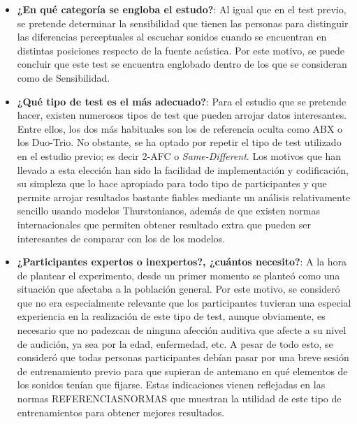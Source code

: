 \documentclass[11pt,a4paper,twoside]{book}
\begin{document}
            \begin{itemize}
                
                \item \textbf{¿En qué categoría se engloba el estudo?}: Al igual que en el test previo, se pretende determinar la sensibilidad que tienen las personas para distinguir las diferencias perceptuales al escuchar sonidos cuando se encuentran en distintas posiciones respecto de la fuente acústica. Por este motivo, se puede concluir que este test se encuentra englobado dentro de los que se consideran como de Sensibilidad.
                \item \textbf{¿Qué tipo de test es el más adecuado?}: Para el estudio que se pretende hacer, existen numerosos tipos de test que pueden arrojar datos interesantes. Entre ellos, los dos más habituales son los de referencia oculta como ABX o los Duo-Trio. No obstante, se ha optado por repetir el tipo de test utilizado en el estudio previo; es decir 2-AFC o \textit{Same-Different}. Los motivos que han llevado a esta elección han sido la facilidad de implementación y codificación, su simpleza que lo hace apropiado para todo tipo de participantes y que permite arrojar resultados bastante fiables mediante un análisis relativamente sencillo usando modelos Thurstonianos, además de que existen normas internacionales que permiten obtener resultado extra que pueden ser interesantes de comparar con los de los modelos.
                \item \textbf{¿Participantes expertos o inexpertos?, ¿cuántos necesito?}: A la hora de plantear el experimento, desde un primer momento se planteó como una situación que afectaba a la población general. Por este motivo, se consideró que no era especialmente relevante que los participantes tuvieran una especial experiencia en la realización de este tipo de test, aunque obviamente, es necesario que no padezcan de ninguna afección auditiva que afecte a su nivel de audición, ya sea por la edad, enfermedad, etc. A pesar de todo esto, se consideró que todas personas participantes debían pasar por una breve sesión de entrenamiento previo para que supieran de antemano en qué elementos de los sonidos tenían que fijarse. Estas indicaciones vienen reflejadas en las normas REFERENCIASNORMAS que muestran la utilidad de este tipo de entrenamientos para obtener mejores resultados.
                

\end{itemize}
\end{document}
